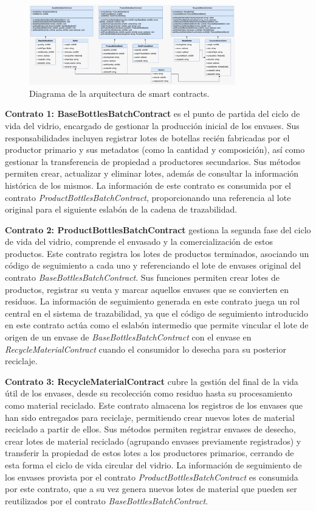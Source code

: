 \begin{figure}[!htb]
    \centering
    \includegraphics[width=0.8\textwidth]{Figures/blockchain-arch.png}
    \caption{Diagrama de la arquitectura de smart contracts.}
    \label{fig:blockchain-architecture}
\end{figure}

\textbf{Contrato 1: BaseBottlesBatchContract}
 es el punto de partida del ciclo de vida del vidrio, encargado de gestionar la producción inicial de los envases. Sus responsabilidades incluyen registrar lotes de botellas recién fabricadas por el productor primario y sus metadatos (como la cantidad y composición), así como gestionar la transferencia de propiedad a productores secundarios. Sus métodos permiten crear, actualizar y eliminar lotes, además de consultar la información histórica de los mismos. La información de este contrato es consumida por el  contrato \textit{ProductBottlesBatchContract}, proporcionando una referencia al lote original para el siguiente eslabón de la cadena de trazabilidad.

\textbf{Contrato 2: ProductBottlesBatchContract}
 gestiona la segunda fase del ciclo de vida del vidrio, comprende el envasado y la comercialización de estos productos. Este contrato registra los lotes de productos terminados, asociando un código de seguimiento a cada uno y referenciando el lote de envases original del contrato \textit{BaseBottlesBatchContract}. Sus funciones permiten crear lotes de productos, registrar su venta y marcar aquellos envases que se convierten en residuos. La información de seguimiento generada en este contrato juega un rol central en el sistema de trazabilidad, ya que el código de seguimiento introducido en este contrato actúa como el eslabón intermedio que permite vincular el lote de origen de un envase de \textit{BaseBottlesBatchContract} con el envase en \textit{RecycleMaterialContract} cuando el consumidor lo desecha para su posterior reciclaje.

\textbf{Contrato 3: RecycleMaterialContract}
 cubre la gestión del final de la vida útil de los envases, desde su recolección como residuo hasta su procesamiento como material reciclado. Este contrato almacena los registros de los envases que han sido entregados para reciclaje, permitiendo crear nuevos lotes de material reciclado a partir de ellos. Sus métodos permiten registrar envases de desecho, crear lotes de material reciclado (agrupando envases previamente registrados) y transferir la propiedad de estos lotes a los productores primarios, cerrando de esta forma el ciclo de vida circular del vidrio. La información de seguimiento de los envases provista por el contrato \textit{ProductBottlesBatchContract} es consumida por este contrato, que a su vez genera nuevos lotes de material que pueden ser reutilizados por el contrato \textit{BaseBottlesBatchContract}.

